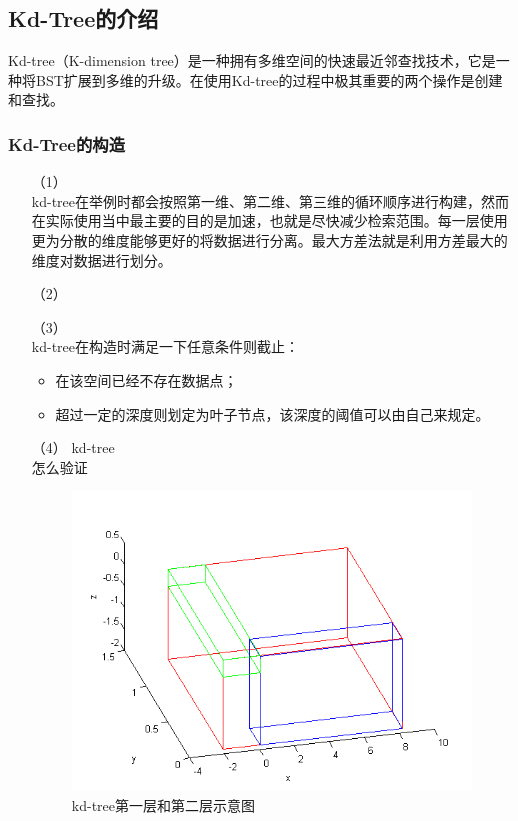 \documentclass[10pt]{article}
\begin{document}
\subsection{Kd-Tree的介绍}
Kd-tree（K-dimension tree）是一种拥有多维空间的快速最近邻查找技术，它是一种将BST扩展到多维的升级。在使用Kd-tree的过程中极其重要的两个操作是创建和查找。
\subsubsection{Kd-Tree的构造}
\begin{itemize}
\item[（1）]{} \mbox{} \\
kd-tree在举例时都会按照第一维、第二维、第三维的循环顺序进行构建，然而在实际使用当中最主要的目的是加速，也就是尽快减少检索范围。每一层使用更为分散的维度能够更好的将数据进行分离。最大方差法就是利用方差最大的维度对数据进行划分。
\item[（2）]{}
\item[（3）]{} \mbox{} \\
kd-tree在构造时满足一下任意条件则截止：
\begin{itemize}
\item{在该空间已经不存在数据点；}
\item{超过一定的深度则划定为叶子节点，该深度的阈值可以由自己来规定。}
\end{itemize}

\item[（4）]{kd-tree} \mbox{} \\
怎么验证
\begin{figure}[H]
\begin{center}
\includegraphics[scale=0.7]{kd-tree-structure.png}
\caption{kd-tree第一层和第二层示意图}
\end{center}
\end{figure}
\end{itemize}
\end{document}
